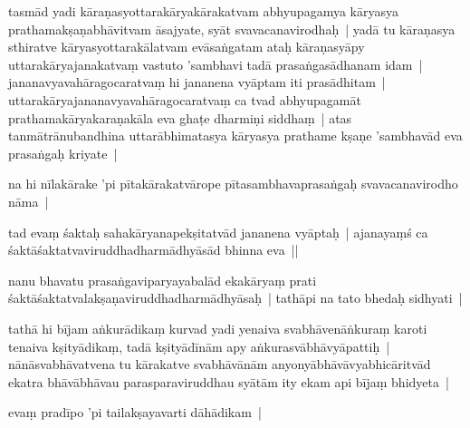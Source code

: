 \documentclass[article,12pt,a4paper]{memoir}%
\newcounter{parCount}
\begin{document}
	  \pstart \leavevmode%
	\label{thakur75-77.12}tasmād yadi kāraṇasyottarakāryakārakatvam abhyupagamya kāryasya prathamakṣaṇabhāvitvam āsajyate, syāt svavacanavirodhaḥ | yadā tu kāraṇasya sthiratve kāryasyottarakālatvam evāsaṅgatam ataḥ kāraṇasyāpy uttarakāryajanakatvaṃ vastuto 'sambhavi tadā prasaṅgasādhanam idam | jananavyavahāragocaratvaṃ hi jananena vyāptam iti prasādhitam | uttarakāryajananavyavahāragocaratvaṃ ca tvad abhyupagamāt prathamakāryakaraṇakāla eva ghaṭe dharmiṇi siddhaṃ | atas tanmātrānubandhina uttarābhimatasya kāryasya prathame kṣaṇe 'sambhavād eva prasaṅgaḥ kriyate | 
	{}
	\pend%
      

	  \pstart \leavevmode%
	\label{thakur75-77.20}na hi nīlakārake 'pi pītakārakatvārope pītasambhavaprasaṅgaḥ svavacanavirodho nāma | 
	{}
	\pend%
      

	  \pstart \leavevmode%
	\label{thakur75-77.21}tad evaṃ śaktaḥ sahakāryanapekṣitatvād jananena vyāptaḥ | ajanayaṃś ca śaktāśaktatvaviruddhadharmādhyāsād bhinna eva ||
	{}
	\pend%
      

	  \pstart \leavevmode%
	\label{thakur75-77.23}nanu bhavatu prasaṅgaviparyayabalād ekakāryaṃ prati śaktāśaktatvalakṣaṇaviruddhadharmādhyāsaḥ | tathāpi na tato bhedaḥ sidhyati | 
	{}
	\pend%
      

	  \pstart \leavevmode%
	\label{thakur75-77.24}tathā hi bījam aṅkurādikaṃ kurvad yadi yenaiva svabhāvenāṅkuraṃ karoti tenaiva kṣityādikaṃ, tadā kṣityādīnām apy aṅkurasvābhāvyāpattiḥ | nānāsvabhāvatvena tu kārakatve svabhāvānām anyonyābhāvāvyabhicāritvād ekatra bhāvābhāvau parasparaviruddhau syātām ity ekam api bījaṃ bhidyeta |
	{}
	\pend%
      

	  \pstart \leavevmode%
	\label{thakur75-77.28}evaṃ pradīpo 'pi tailakṣayavarti dāhādikam | 
	{}
	\pend%
      
\end{document}
